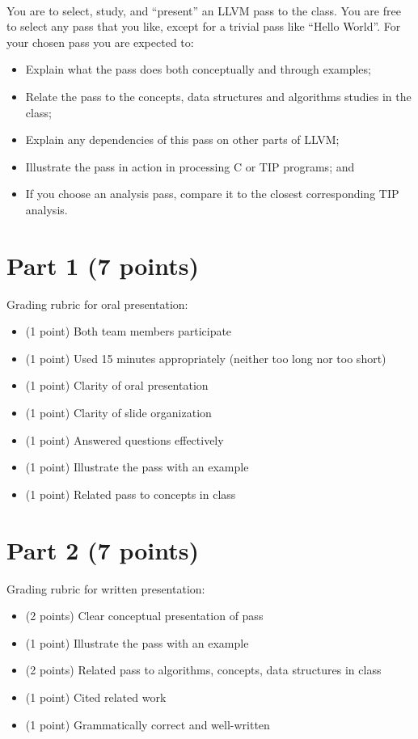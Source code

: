 \documentclass[12pt,letterpaper]{article}
\begin{document}
~

You are to select, study, and ``present'' an LLVM pass to the class.
You are free to select any pass that you like, except for a trivial
pass like ``Hello World''.
For your chosen pass you are expected to:
\begin{itemize}
\item Explain what the pass does both conceptually and through examples;
\item Relate the pass to the concepts, data structures and algorithms studies in the class;
\item Explain any dependencies of this pass on other parts of LLVM;
\item Illustrate the pass in action in processing C or TIP programs; and
\item If you choose an analysis pass, compare it to the closest corresponding TIP analysis. 
\end{itemize}

\section*{Part 1 (7 points)}
Grading rubric for oral presentation:
\begin{itemize}
\item (1 point) Both team members participate
\item (1 point) Used 15 minutes appropriately (neither too long nor too short)
\item (1 point) Clarity of oral presentation
\item (1 point) Clarity of slide organization
\item (1 point) Answered questions effectively
\item (1 point) Illustrate the pass with an example
\item (1 point) Related pass to concepts in class
\end{itemize}



\section*{Part 2 (7 points)}
Grading rubric for written presentation:
\begin{itemize}
\item (2 points) Clear conceptual presentation of pass
\item (1 point) Illustrate the pass with an example
\item (2 points) Related pass to algorithms, concepts, data structures in class
\item (1 point) Cited related work
\item (1 point) Grammatically correct and well-written
\end{itemize}
\end{document}
